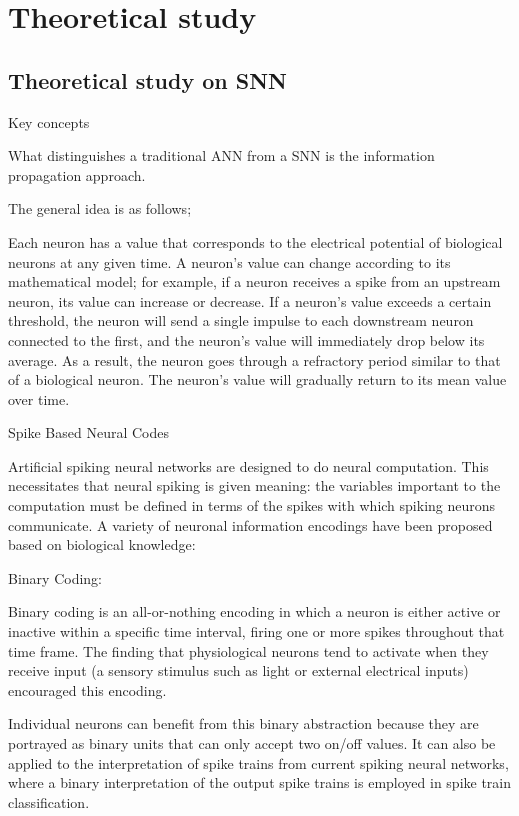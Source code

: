 \documentclass[11pt]{article}
\begin{document}
\section{Theoretical study}
\subsection{Theoretical study on SNN}
{\color{blue}
  Key concepts

  What distinguishes a traditional ANN from a SNN is the information propagation approach.

  The general idea is as follows;

  Each neuron has a value that corresponds to the electrical potential of biological neurons at any given time.
  A neuron's value can change according to its mathematical model; for example, if a neuron receives a spike from an upstream neuron, its value can increase or decrease.
  If a neuron's value exceeds a certain threshold, the neuron will send a single impulse to each downstream neuron connected to the first, and the neuron's value will immediately drop below its average.
  As a result, the neuron goes through a refractory period similar to that of a biological neuron. The neuron's value will gradually return to its mean value over time.

  Spike Based Neural Codes

  Artificial spiking neural networks are designed to do neural computation. This necessitates that neural spiking is given meaning: the variables important to the computation must be defined in terms of the spikes with which spiking neurons communicate. A variety of neuronal information encodings have been proposed based on biological knowledge:

  Binary Coding:

  Binary coding is an all-or-nothing encoding in which a neuron is either active or inactive within a specific time interval, firing one or more spikes throughout that time frame. The finding that physiological neurons tend to activate when they receive input (a sensory stimulus such as light or external electrical inputs) encouraged this encoding.

  Individual neurons can benefit from this binary abstraction because they are portrayed as binary units that can only accept two on/off values. It can also be applied to the interpretation of spike trains from current spiking neural networks, where a binary interpretation of the output spike trains is employed in spike train classification.

}
\end{document}
